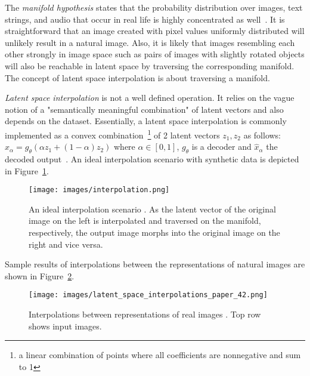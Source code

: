 \documentclass[a4paper,12pt]{report}
\begin{document}
The \textit{manifold hypothesis} states that the probability distribution over images, text strings, and audio that occur in real life is highly concentrated as well~\cite{ReprLearning}. It is straightforward that an image created with pixel values uniformly distributed will unlikely result in a natural image. Also, it is likely that images resembling each other strongly in image space such as pairs of images with slightly rotated objects will also be reachable in latent space by traversing the corresponding manifold. The concept of latent space interpolation is about traversing a manifold.

\textit{Latent space interpolation} is not a well defined operation. It relies on the vague notion of a "semantically meaningful combination" of latent vectors and also depends on the dataset. Essentially, a latent space interpolation is commonly implemented as a convex combination~\footnote{a linear combination of points where all coefficients are nonnegative and sum to 1} of 2 latent vectors $z_1, z_2$ as follows: $\hat{x}_{\alpha} = g_{\theta}(\alpha z_1+(1-\alpha)z_2)$ where $\alpha \in [0,1]$, $g_{\theta}$ is a decoder and $\hat{x}_{\alpha}$ the decoded output~\cite{AE_Interp}. An ideal interpolation scenario with synthetic data is depicted in Figure~\ref{fig:interpolation_ideal}.
\begin{figure}[ht]
\centering
\texttt{[image: images/interpolation.png]}
\caption{An ideal interpolation scenario \cite{InkscapeInterpolation}. As the latent vector of the original image on the left is interpolated and traversed on the manifold, respectively, the output image morphs into the original image on the right and vice versa.}
\label{fig:interpolation_ideal}
\end{figure}

Sample results of interpolations between the representations of natural images are shown in Figure~\ref{fig:interpolation_real}.
\begin{figure}[ht]
\centering
\texttt{[image: images/latent\_space\_interpolations\_paper\_42.png]}
\caption{Interpolations between representations of real images \cite{InterpolExamples}. Top row shows input images.}
\label{fig:interpolation_real}
\end{figure}


\end{document}
